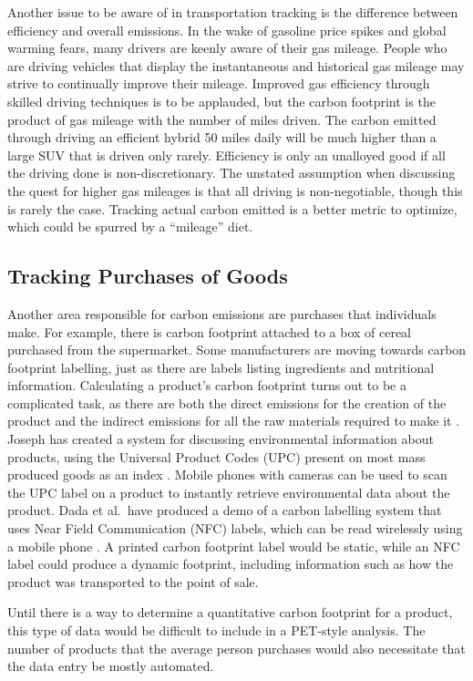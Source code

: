 Another issue to be aware of in transportation tracking is the difference between efficiency and overall emissions. In the wake of gasoline price spikes and global warming fears, many drivers are keenly aware of their gas mileage. People who are driving vehicles that display the instantaneous and historical gas mileage may strive to continually improve their mileage. Improved gas efficiency through skilled driving techniques is to be applauded, but the carbon footprint is the product of gas mileage with the number of miles driven. The carbon emitted through driving an efficient hybrid 50 miles daily will be much higher than a large SUV that is  driven only rarely. Efficiency is only an unalloyed good if all the driving done is non-discretionary. The unstated assumption when discussing the quest for higher gas mileages is that all driving is non-negotiable, though this is rarely the case. Tracking actual carbon emitted is a better metric to optimize, which could be spurred by a ``mileage'' diet.

\subsection{Tracking Purchases of Goods}
Another area responsible for carbon emissions are purchases that individuals make. For example, there is carbon footprint attached to a box of cereal purchased from the supermarket. Some manufacturers are moving towards carbon footprint labelling, just as there are labels listing ingredients and nutritional information. Calculating a product's carbon footprint turns out to be a complicated task, as there are both the direct emissions for the creation of the product and the indirect emissions for all the raw materials required to make it \cite{Wiedmann2007carbon-footprint}. Joseph has created a system for discussing environmental information about products, using the Universal Product Codes (UPC) present on most mass produced goods as an index \cite{Joseph2009Ecoproductpedia}. Mobile phones with cameras can be used to scan the UPC label on a product to instantly retrieve environmental data about the product. Dada et al.\ have produced a demo of a carbon labelling system that uses Near Field Communication (NFC) labels, which can be read wirelessly using a mobile phone \cite{dada-demo-pervasive-2008}. A printed carbon footprint label would be static, while an NFC label could produce a dynamic footprint, including information such as how the product was transported to the point of sale.

Until there is a way to determine a quantitative carbon footprint for a product, this type of data would be difficult to include in a PET-style analysis. The number of products that the average person purchases would also necessitate that the data entry be mostly automated.

